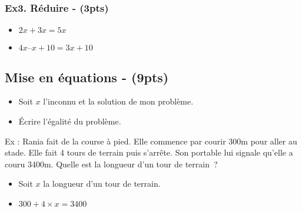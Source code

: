 \subsubsection*{Ex3. Réduire - (3pts)}

\begin{itemize}[label={$\bullet$}]
  \item  $2x + 3x = 5x$
  \item  $4x – x + 10 = 3x + 10$
\end{itemize}

\subsection*{Mise en équations - (9pts)}

\begin{itemize}[label={$\bullet$}]
  \item  Soit $x$ l’inconnu et la solution de mon problème.
  \item  Écrire l’égalité du problème.
\end{itemize}

Ex : Rania fait de la course à pied. Elle commence par courir 300m pour aller au stade. Elle fait 4 tours de terrain puis s’arrête. Son portable lui signale qu’elle a couru 3400m. Quelle est la longueur d’un tour de terrain ?

\begin{itemize}[label={$\bullet$}]
  \item  Soit $x$ la longueur d’un tour de terrain.
  \item  $300 + 4 \times x = 3400$
\end{itemize}

